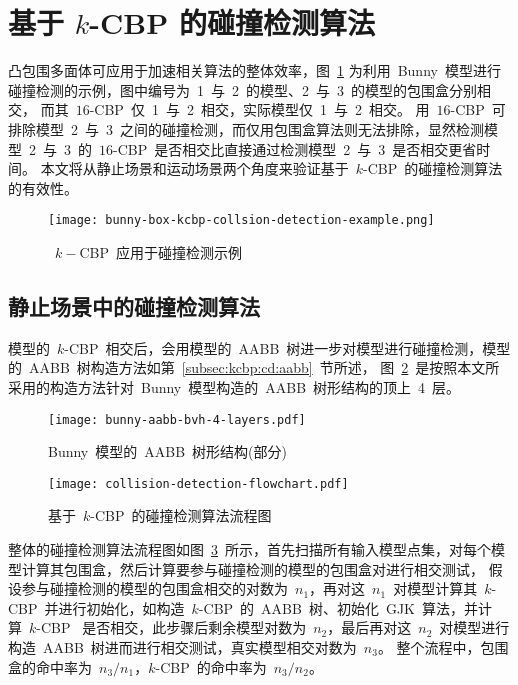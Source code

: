 \section{基于 $k$-CBP 的碰撞检测算法}
\label{sec:cd:baseon:kcbp}

凸包围多面体可应用于加速相关算法的整体效率，图~\ref{lbl:bunny-box-kcbp-collsion-detection-example}
为利用~Bunny~模型进行碰撞检测的示例，图中编号为~1~与~2~的模型、2~与~3~的模型的包围盒分别相交， 而其~$16$-CBP~仅~1~与~2~相交，实际模型仅~1~与~2~相交。
用~$16$-CBP~可排除模型~2~与~3~之间的碰撞检测，而仅用包围盒算法则无法排除，显然检测模型~2~与~3~的~$16$-CBP~是否相交比直接通过检测模型~2~与~3~是否相交更省时间。
本文将从静止场景和运动场景两个角度来验证基于~$k$-CBP~的碰撞检测算法的有效性。 

\begin{figure}[H] 
\centering
\texttt{[image: bunny-box-kcbp-collsion-detection-example.png]}
\caption{~$k-$CBP~应用于碰撞检测示例}
\label{lbl:bunny-box-kcbp-collsion-detection-example}
\end{figure}

\subsection{静止场景中的碰撞检测算法}
\label{subsec:static:cd}

模型的~$k$-CBP~相交后，会用模型的~AABB~树进一步对模型进行碰撞检测，模型的~AABB~树构造方法如第~\ref{subsec:kcbp:cd:aabb}~节所述，
图~\ref{fig:bunny:aabb:bvh:toplayer4}~是按照本文所采用的构造方法针对~Bunny~模型构造的~AABB~树形结构的顶上~4~层。

\begin{figure}[htpb]
  \centering
  \texttt{[image: bunny-aabb-bvh-4-layers.pdf]}
  \caption{Bunny~模型的~AABB~树形结构(部分)}
  \label{fig:bunny:aabb:bvh:toplayer4}
\end{figure}

\begin{figure}[htpb]
  \centering
  \texttt{[image: collision-detection-flowchart.pdf]}
  \caption{基于~$k$-CBP~的碰撞检测算法流程图}
  \label{fig:flowchart:cd}
\end{figure}

整体的碰撞检测算法流程图如图~\ref{fig:flowchart:cd}~所示，首先扫描所有输入模型点集，对每个模型计算其包围盒，然后计算要参与碰撞检测的模型的包围盒对进行相交测试，
假设参与碰撞检测的模型的包围盒相交的对数为~$n_1$，再对这~$n_1$~对模型计算其~$k$-CBP~并进行初始化，如构造~$k$-CBP~的~AABB~树、初始化~GJK~算法，并计算~$k$-CBP~
是否相交，此步骤后剩余模型对数为~$n_2$，最后再对这~$n_2$~对模型进行构造~AABB~树进而进行相交测试，真实模型相交对数为~$n_3$。
整个流程中，包围盒的命中率为~$n_3 / n_1$，$k$-CBP~的命中率为~$n_3/n_2$。

